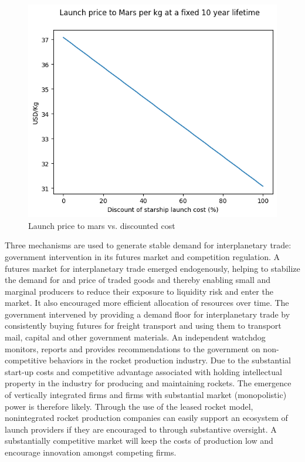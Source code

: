 \documentclass[fleqn,10pt]{Stylesheet} %
\begin{document}
\begin{figure}
    \centering
    \includegraphics[width=\linewidth]{fig_disclaunchflights.png}
    \caption{Launch price to mars vs. discounted cost}
    \label{fig:flight_cost}
\end{figure}


Three mechanisms are used to generate stable demand for interplanetary trade: government intervention in its futures market and competition regulation. A futures market for interplanetary trade emerged endogenously, helping to stabilize the demand for and price of traded goods and thereby enabling small and marginal producers to reduce their exposure to liquidity risk and enter the market. It also encouraged more efficient allocation of resources over time. The government intervened by providing a demand floor for interplanetary trade by consistently buying futures for freight transport and using them to transport mail, capital and other government materials. An independent watchdog monitors, reports and provides recommendations to the government on non-competitive behaviors in the rocket production industry. Due to the substantial start-up costs and competitive advantage associated with holding intellectual property in the industry for producing and maintaining rockets. The emergence of vertically integrated firms and firms with substantial market (monopolistic) power is therefore likely. Through the use of the leased rocket model, nonintegrated rocket production companies can easily support an ecosystem of launch providers if they are encouraged to through substantive oversight. A substantially competitive market will keep the costs of production low and encourage innovation amongst competing firms.
\end{document}
